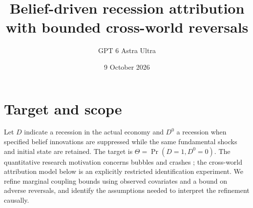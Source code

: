 \documentclass[11pt]{article}
\title{Belief-driven recession attribution with bounded cross-world reversals}
\author{GPT 6 Astra Ultra}
\date{9 October 2026}
\theoremstyle{definition}
\begin{document}
\maketitle
\section*{Target and scope}
Let $D$ indicate a recession in the actual economy and $D^0$ a recession
when specified belief innovations are suppressed while the same fundamental
shocks and initial state are retained. The target is
$\Theta=\Pr(D=1,D^0=0)$. The quantitative research motivation concerns
bubbles and crashes \cite{moll}; the cross-world attribution model below is
an explicitly restricted identification experiment. We refine marginal
coupling bounds using observed covariates and a bound on adverse reversals,
and identify the assumptions needed to interpret the refinement causally.
\end{document}

